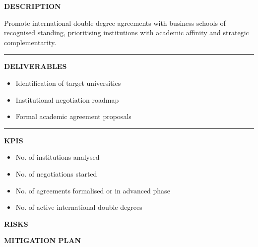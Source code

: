 \documentclass[11pt,a4paper]{scrreprt}
\newcommand{\fieldlabel}[1]{%
  {\footnotesize\sffamily\bfseries\color{mutedcolor}\MakeUppercase{#1}}\par\nopagebreak[4]
}
\newcommand{\fieldsep}{\vspace{3pt}\noindent\textcolor{bordercolor}{\rule{\linewidth}{0.4pt}}\vspace{3pt}\par}
\begin{document}
\begin{tcolorbox}[pabox={fgcolor}{A.P.5.1 \enspace\textbullet\enspace Promote International Double Degree Agreements with Business Schools of Recognised Standing}]

\fieldlabel{Description}
{\small Promote international double degree agreements with business schools of recognised standing, prioritising institutions with academic affinity and strategic complementarity.}\par
\fieldsep
\fieldlabel{Deliverables}
{\small \begin{itemize}[noitemsep,topsep=2pt]
\item Identification of target universities
\item Institutional negotiation roadmap
\item Formal academic agreement proposals
\end{itemize}}\par
\fieldsep
\fieldlabel{KPIs}
{\small \begin{itemize}[noitemsep,topsep=2pt]
\item No. of institutions analysed
\item No. of negotiations started
\item No. of agreements formalised or in advanced phase
\item No. of active international double degrees
\end{itemize}}\par
\end{tcolorbox}
\begin{tcolorbox}[riskbox]
{\footnotesize\sffamily\bfseries\color{red!50!black} RISKS}\par{}
\end{tcolorbox}
\begin{tcolorbox}[mitbox]
{\footnotesize\sffamily\bfseries\color{green!40!black} MITIGATION PLAN}\par{}
\end{tcolorbox}
\vspace{8pt}
\end{document}
